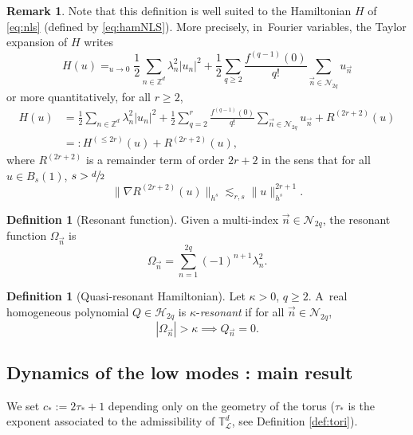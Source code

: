 \documentclass[10pt,a4paper]{amsart}
\theoremstyle{plain}
\theoremstyle{definition}
\newtheorem{definition}[theorem]{Definition}
\newtheorem{remark}[theorem]{Remark}
\newcommand{\1}{\mathbf{1}}
\begin{document}
\begin{remark} Note that this definition is well suited to the Hamiltonian $H$ of \eqref{eq:nls} (defined by \eqref{eq:hamNLS}). More precisely, in~Fourier variables, the Taylor expansion of $H$ writes
\[
H(u) \mathop{=}_{u \to 0} \frac12 \sum_{n\in \mathbb{Z}^d} \lambda_n^2 |u_n|^2 + \frac12 \sum_{q\geq 2} \frac{f^{(q-1)}(0)}{q!} \sum_{\vec{n}\in\mathcal{N}_{2q}} u_{\vec{n}}
\]
or more quantitatively, for all $r\geq 2$,
\begin{equation}
\label{eq:expansion_ham}
\begin{split}
H(u) &= \frac12 \sum_{n\in \mathbb{Z}^d} \lambda_n^2 |u_n|^2 + \frac12 \sum_{q=2}^r \frac{f^{(q-1)}(0)}{q!} \sum_{\vec{n}\in\mathcal{N}_{2q}} u_{\vec{n}}+ R^{(2r+2)} (u) \\ &=:H^{(\leq 2r)}(u) + R^{(2r+2)} (u),
\end{split}
\end{equation}
where $R^{(2r+2)} $ is a remainder term of order $2r+2$ in the sens that for all $u\in B_s(1)$, $s>\sfrac{d}{2}$
\begin{equation}
\label{eq:rem_NLS}
\| \nabla R^{(2r+2)} (u) \|_{h^s} \lesssim_{r,s} \| u \|_{h^s}^{2r+1}.
\end{equation}
\end{remark}

\begin{definition}[Resonant function] Given a multi-index $\vec{n}\in\mathcal{N}_{2q}$, the resonant function $\Omega_{\vec{n}}$ is
\[
\Omega_{\vec{n}} = \sum_{n=1}^{2q}(-1)^{n+1}\lambda_{n}^{2}.
\]
\end{definition}

\begin{definition}[Quasi-resonant Hamiltonian]\label{def:non-kappa} Let $\kappa>0$, $q\geq2$. A~real homogeneous polynomial $Q \in \mathcal{H}_{2q}$
is $\kappa$-\emph{resonant} if for all $\vec{n}\in\mathcal{N}_{2q}$,
\[
|\Omega_{\vec{n}}| > \kappa\implies Q_{\vec{n}} = 0.
\]
\end{definition}

\subsection{Dynamics of the low modes : main result}

We set $c_* := 2\tau_\ast +1$ depending only on the geometry of the torus ($\tau_\ast$ is the exponent associated to the admissibility of $\mathbb{T}^d_{\mathscr{L}}$, see Definition \ref{def:tori}).
\end{document}
